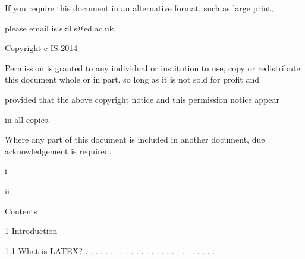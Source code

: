 \documentclass[a4paper,portrait,12pt]{article}
\begin{document}
\begin{flushleft}
If you require this document in an alternative format, such as large print,
\end{flushleft}


\begin{flushleft}
please email is.skills@ed.ac.uk.
\end{flushleft}


\begin{flushleft}
Copyright c IS 2014
\end{flushleft}


\begin{flushleft}
Permission is granted to any individual or institution to use, copy or redistribute this document whole or in part, so long as it is not sold for profit and
\end{flushleft}


\begin{flushleft}
provided that the above copyright notice and this permission notice appear
\end{flushleft}


\begin{flushleft}
in all copies.
\end{flushleft}


\begin{flushleft}
Where any part of this document is included in another document, due acknowledgement is required.
\end{flushleft}





\begin{flushleft}
i
\end{flushleft}





\begin{flushleft}
\newpage
ii
\end{flushleft}





\begin{flushleft}
\newpage
Contents
\end{flushleft}


\begin{flushleft}
1 Introduction
\end{flushleft}


\begin{flushleft}
1.1 What is LATEX? . . . . . . . . . . . . . . . . . . . . . . . . . .
\end{flushleft}
\end{document}
